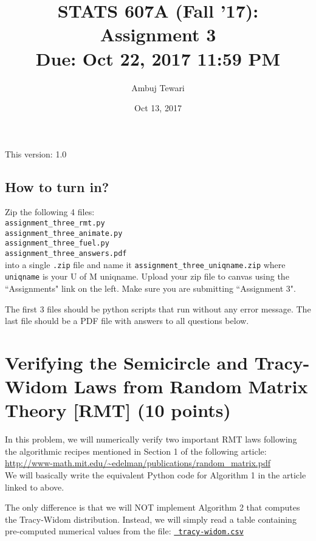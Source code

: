\documentclass{article}
\begin{document}
\author{Ambuj Tewari}
\title{STATS 607A (Fall '17): Assignment 3\\
Due: Oct 22, 2017 11:59 PM}
\date{Oct 13, 2017}

\maketitle

\begin{center}
This version: 1.0
\end{center}

\subsection*{How to turn in?}

Zip the following 4 files:\\
{\tt assignment\_three\_rmt.py} \\
{\tt assignment\_three\_animate.py} \\
{\tt assignment\_three\_fuel.py} \\
{\tt assignment\_three\_answers.pdf} \\
into a single {\tt .zip} file and name it {\tt assignment\_three\_uniqname.zip} where {\tt uniqname} is your U of M uniqname. Upload your zip file to canvas using the ``Assignments" link on the left. Make sure
 you are submitting ``Assignment 3".

The first 3 files should be python scripts that run without any error message. The last file should be a PDF file with answers to all questions below. 

\section{Verifying the Semicircle and Tracy-Widom Laws from Random Matrix
Theory [RMT] (10 points)}

In this problem, we will numerically verify two important RMT laws following
the algorithmic recipes mentioned in Section 1 of the following article: \\
\url{http://www-math.mit.edu/~edelman/publications/random_matrix.pdf}\\
We will basically write the equivalent Python code for Algorithm 1 in the article linked to above.

The only difference is that we will NOT implement Algorithm 2 that computes the
Tracy-Widom distribution. Instead, we will simply read a table containing
pre-computed numerical values from the file:
\href{https://github.com/ambujtewari/stats607a-fall2017/blob/master/homeworks/datasets/tracy-widom.csv}{\tt
tracy-widom.csv} 
\end{document}
